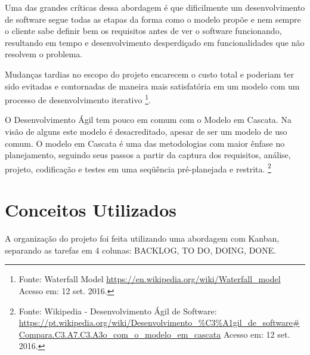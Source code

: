 \par Uma das grandes críticas dessa abordagem é que dificilmente um desenvolvimento de software segue todas as etapas da forma como o modelo propõe  e nem sempre o cliente sabe definir bem os requisitos antes de ver o software funcionando, resultando em tempo e desenvolvimento desperdiçado em funcionalidades que não resolvem o problema. \citep{pressman:11}
\par Mudanças tardias no escopo do projeto encarecem o custo total e poderiam ter sido evitadas e contornadas de maneira mais satisfatória em um modelo com um processo de desenvolvimento iterativo \footnote{ Fonte: Waterfall Model \url {https://en.wikipedia.org/wiki/Waterfall_model} Acesso em: 12 set. 2016.}.
\par O Desenvolvimento Ágil tem pouco em comum com o Modelo em Cascata. Na visão de alguns este modelo é desacreditado, apesar de ser um modelo de uso comum. O modelo em Cascata é uma das metodologias com maior ênfase no planejamento, seguindo seus passos a partir da captura dos requisitos, análise, projeto, codificação e testes em uma seqüência pré-planejada e restrita. \footnote {Fonte: Wikipedia - Desenvolvimento Ágil de Software: \url{https://pt.wikipedia.org/wiki/Desenvolvimento_\%C3\%A1gil_de_software#Compara.C3.A7.C3.A3o_com_o_modelo_em_cascata} Acesso em: 12 set. 2016.}

\section{Conceitos Utilizados}

\par A organização do projeto foi feita utilizando uma abordagem com Kanban, separando as tarefas em 4 colunas: BACKLOG, TO DO, DOING, DONE.


